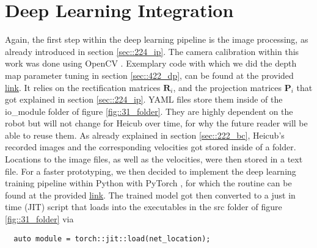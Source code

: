 \FloatBarrier
\section{Deep Learning Integration}
\label{sec::33_dl}
Again, the first step within the deep learning pipeline is the image processing, as already introduced in section  \ref{sec::224_ip}. The camera calibration within this work was done using OpenCV \cite{opencv_library}. Exemplary code with which we did the depth map parameter tuning in section \ref{sec::422_dp}, can be found at the provided \href{https://github.com/mhubii/nmpc_pattern_generator/blob/master/src/tune_disp_map.cpp}{\underline{link}}. It relies on the rectification matrices $\bm{R}_i$, and the projection matrices $\bm{P}_i$ that got explained in section \ref{sec::224_ip}. YAML files store them inside of the io\_module folder of figure \ref{fig::31_folder}. They are highly dependent on the robot but will not change for Heicub over time, for why the future reader will be able to reuse them. As already explained in section \ref{sec::222_bc}, Heicub's recorded images and the corresponding velocities got stored inside of a folder. Locations to the image files, as well as the velocities, were then stored in a text file. For a faster prototyping, we then decided to implement the deep learning training pipeline within Python with PyTorch \cite{paszke2017automatic}, for which the routine can be found at the provided \href{https://github.com/mhubii/nmpc_pattern_generator/blob/master/libs/learning/python/train_rgbd.py}{\underline{link}}. The trained model got then converted to a just in time (JIT) script that loads into the executables in the src folder of figure \ref{fig::31_folder} via
\begin{verbatim}
  auto module = torch::jit::load(net_location);
\end{verbatim}

